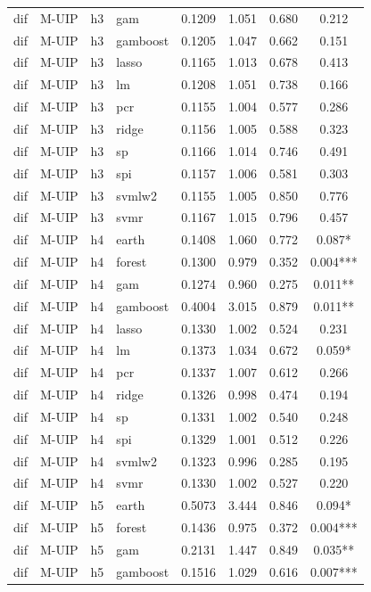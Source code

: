 \begin{ThreePartTable}
\begin{longtable}[t]{llclcccc}
dif & M-UIP & h3 & gam & 0.1209 & 1.051 & 0.680 & 0.212\\
dif & M-UIP & h3 & gamboost & 0.1205 & 1.047 & 0.662 & 0.151\\
dif & M-UIP & h3 & lasso & 0.1165 & 1.013 & 0.678 & 0.413\\
dif & M-UIP & h3 & lm & 0.1208 & 1.051 & 0.738 & 0.166\\
dif & M-UIP & h3 & pcr & 0.1155 & 1.004 & 0.577 & 0.286\\
dif & M-UIP & h3 & ridge & 0.1156 & 1.005 & 0.588 & 0.323\\
dif & M-UIP & h3 & sp & 0.1166 & 1.014 & 0.746 & 0.491\\
dif & M-UIP & h3 & spi & 0.1157 & 1.006 & 0.581 & 0.303\\
dif & M-UIP & h3 & svmlw2 & 0.1155 & 1.005 & 0.850 & 0.776\\
dif & M-UIP & h3 & svmr & 0.1167 & 1.015 & 0.796 & 0.457\\
\addlinespace
dif & M-UIP & h4 & earth & 0.1408 & 1.060 & 0.772 & 0.087*\\
dif & M-UIP & h4 & forest & 0.1300 & 0.979 & 0.352 & 0.004***\\
dif & M-UIP & h4 & gam & 0.1274 & 0.960 & 0.275 & 0.011**\\
dif & M-UIP & h4 & gamboost & 0.4004 & 3.015 & 0.879 & 0.011**\\
dif & M-UIP & h4 & lasso & 0.1330 & 1.002 & 0.524 & 0.231\\
dif & M-UIP & h4 & lm & 0.1373 & 1.034 & 0.672 & 0.059*\\
dif & M-UIP & h4 & pcr & 0.1337 & 1.007 & 0.612 & 0.266\\
dif & M-UIP & h4 & ridge & 0.1326 & 0.998 & 0.474 & 0.194\\
dif & M-UIP & h4 & sp & 0.1331 & 1.002 & 0.540 & 0.248\\
dif & M-UIP & h4 & spi & 0.1329 & 1.001 & 0.512 & 0.226\\
dif & M-UIP & h4 & svmlw2 & 0.1323 & 0.996 & 0.285 & 0.195\\
dif & M-UIP & h4 & svmr & 0.1330 & 1.002 & 0.527 & 0.220\\
\addlinespace
dif & M-UIP & h5 & earth & 0.5073 & 3.444 & 0.846 & 0.094*\\
dif & M-UIP & h5 & forest & 0.1436 & 0.975 & 0.372 & 0.004***\\
dif & M-UIP & h5 & gam & 0.2131 & 1.447 & 0.849 & 0.035**\\
dif & M-UIP & h5 & gamboost & 0.1516 & 1.029 & 0.616 & 0.007***\\

\end{longtable}
\end{ThreePartTable}
